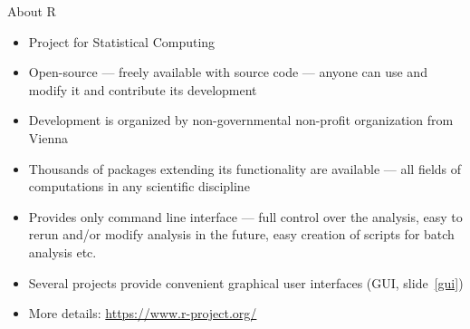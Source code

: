 \documentclass[compress, xelatex, 11pt, xcolor=svgnames, aspectratio=169, url={hyphens, lowtilde}]{beamer}
\begin{document}
\begin{frame}{About R}
	\begin{itemize}
		\item Project for Statistical Computing
		\item Open-source --- freely available with source code --- anyone can use and modify it and contribute its development
		\item Development is organized by non-governmental non-profit organization from Vienna
		\item Thousands of packages extending its functionality are available --- all fields of computations in any scientific discipline
		\item Provides only command line interface --- full control over the analysis, easy to rerun and/or modify analysis in the future, easy creation of scripts for batch analysis etc.
		\item Several projects provide convenient graphical user interfaces (GUI, slide~\ref{gui})
		\item More details: \url{https://www.r-project.org/}
	\end{itemize}
\end{frame}
\end{document}
